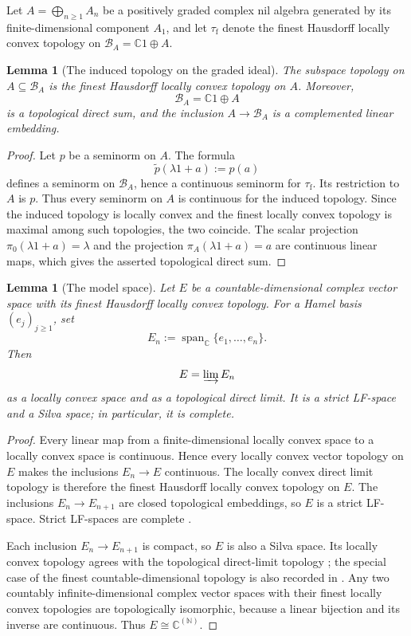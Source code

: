 \documentclass[11pt]{article}
\newtheorem{lemma}[theorem]{Lemma}
\theoremstyle{remark}
\begin{document}
Let $A=\bigoplus_{n\geq1}A_n$ be a positively graded complex nil algebra
generated by its finite-dimensional component $A_1$, and let
$\tau_{\mathrm f}$ denote the finest Hausdorff locally convex topology on
$\mathcal B_A=\mathbb C1\oplus A$.

\begin{lemma}[The induced topology on the graded ideal]
\label{lem:induced-topology}
The subspace topology on $A\subseteq\mathcal B_A$ is the finest Hausdorff
locally convex topology on $A$.  Moreover,
\[
  \mathcal B_A=\mathbb C1\oplus A
\]
is a topological direct sum, and the inclusion $A\to\mathcal B_A$ is a
complemented linear embedding.
\end{lemma}

\begin{proof}
Let $p$ be a seminorm on $A$.  The formula
\[
  \widetilde p(\lambda1+a):=p(a)
\]
defines a seminorm on $\mathcal B_A$, hence a continuous seminorm for
$\tau_{\mathrm f}$.  Its restriction to $A$ is $p$.  Thus every seminorm on
$A$ is continuous for the induced topology.  Since the induced topology is
locally convex and the finest locally convex topology is maximal among such
topologies, the two coincide.  The scalar projection
$\pi_0(\lambda1+a)=\lambda$ and the projection
$\pi_A(\lambda1+a)=a$ are continuous linear maps, which gives the asserted
topological direct sum.
\end{proof}

\begin{lemma}[The model space]
\label{lem:model-space}
Let $E$ be a countable-dimensional complex vector space with its
finest Hausdorff locally convex topology.  For a Hamel basis
$(e_j)_{j\geq1}$, set
\[
  E_n:=\operatorname{span}_{\mathbb C}\{e_1,\ldots,e_n\}.
\]
Then
\[
  E=\varinjlim E_n
\]
as a locally convex space and as a topological direct limit.  It is a strict
LF-space and a Silva space; in particular, it is complete.
\end{lemma}

\begin{proof}
Every linear map from a finite-dimensional locally convex space to a locally
convex space is continuous.  Hence every locally convex vector topology on
$E$ makes the inclusions $E_n\to E$ continuous.  The locally convex direct
limit topology is therefore the finest Hausdorff locally convex topology on
$E$.  The inclusions $E_n\to E_{n+1}$ are closed topological embeddings, so
$E$ is a strict LF-space.  Strict LF-spaces are complete
\cite[Chapter~II, \S6, pp.~59--61]{SchaeferWolff}.

Each inclusion $E_n\to E_{n+1}$ is compact, so $E$ is also a Silva space.
Its locally convex topology agrees with the topological direct-limit topology
\cite[Proposition~B.13.13(a)]{GlocknerNeebBook2026}; the special case of the
finest countable-dimensional topology is also recorded in
\cite[Appendix~D]{NeebRusso2024}.  Any two countably
infinite-dimensional complex vector spaces with their finest locally convex
topologies are topologically isomorphic, because a linear bijection and its
inverse are continuous.  Thus $E\cong\mathbb{C}^{(\mathbb{N})}$.
\end{proof}
\end{document}
